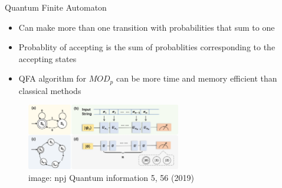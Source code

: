 \documentclass[aspectratio=169,9pt]{beamer}
\begin{document}
\begin{frame}[t]{Quantum Finite Automaton}
  \begin{itemize}
    \item Can make more than one transition with probabilities that sum to one
    \item Probablity of accepting is the sum of probablities corresponding to the accepting states
    \item QFA algorithm for $MOD_p$ can be more time and memory efficient than classical methods
  \end{itemize}
  \begin{figure}
    \includegraphics[width=0.6\textwidth]{DFA.png}
    \caption*{image: npj Quantum information 5, 56 (2019)}
  \end{figure}
\end{frame}


\end{document}
